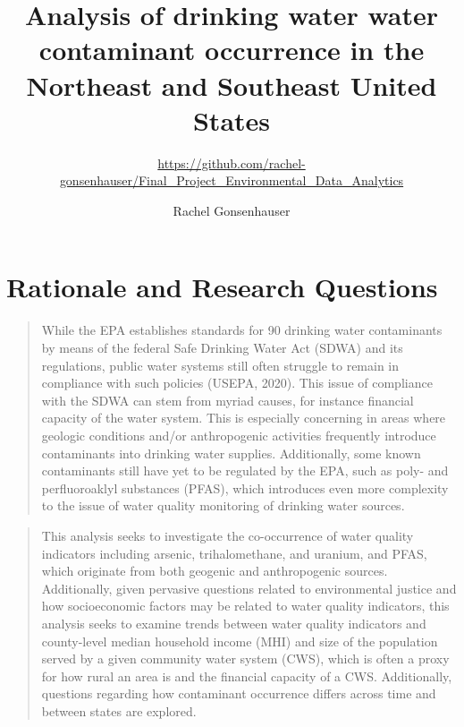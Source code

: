 \documentclass[12pt,]{article}
\title{Analysis of drinking water water contaminant occurrence in the Northeast
and Southeast United States}
\subtitle{\url{https://github.com/rachel-gonsenhauser/Final_Project_Environmental_Data_Analytics}}
\author{Rachel Gonsenhauser}
\date{}
\begin{document}
\maketitle

\newpage
\abstract

\begin{quote}
\end{quote}

\newpage
\tableofcontents 
\newpage
\listoftables 
\newpage
\listoffigures 
\newpage

\hypertarget{rationale-and-research-questions}{%
\section{Rationale and Research
Questions}\label{rationale-and-research-questions}}

\begin{quote}
While the EPA establishes standards for 90 drinking water contaminants
by means of the federal Safe Drinking Water Act (SDWA) and its
regulations, public water systems still often struggle to remain in
compliance with such policies (USEPA, 2020). This issue of compliance
with the SDWA can stem from myriad causes, for instance financial
capacity of the water system. This is especially concerning in areas
where geologic conditions and/or anthropogenic activities frequently
introduce contaminants into drinking water supplies. Additionally, some
known contaminants still have yet to be regulated by the EPA, such as
poly- and perfluoroaklyl substances (PFAS), which introduces even more
complexity to the issue of water quality monitoring of drinking water
sources.
\end{quote}

\begin{quote}
This analysis seeks to investigate the co-occurrence of water quality
indicators including arsenic, trihalomethane, and uranium, and PFAS,
which originate from both geogenic and anthropogenic sources.
Additionally, given pervasive questions related to environmental justice
and how socioeconomic factors may be related to water quality
indicators, this analysis seeks to examine trends between water quality
indicators and county-level median household income (MHI) and size of
the population served by a given community water system (CWS), which is
often a proxy for how rural an area is and the financial capacity of a
CWS. Additionally, questions regarding how contaminant occurrence
differs across time and between states are explored.
\end{quote}
\end{document}
